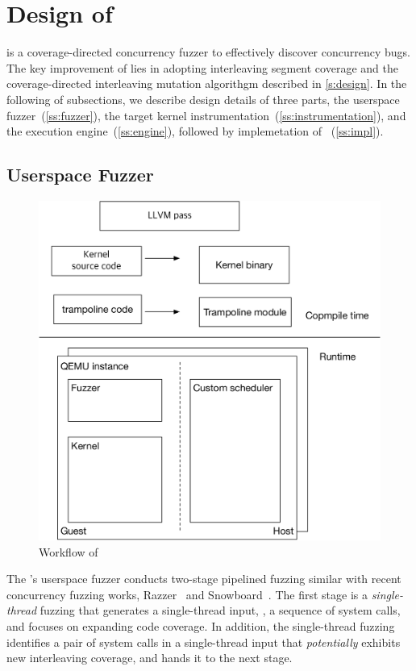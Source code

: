 \section{Design of \sys}
\label{s:impl}

\sys is a coverage-directed concurrency fuzzer to effectively discover
concurrency bugs.
%
The key improvement of \sys lies in adopting interleaving segment
coverage and the coverage-directed interleaving mutation algorithgm
described in \autoref{s:design}.
%
In the following of subsections, we describe design details of three
parts, the userspace fuzzer~(\autoref{ss:fuzzer}), the target kernel
instrumentation~(\autoref{ss:instrumentation}), and the execution
engine~(\autoref{ss:engine}), followed by implemetation of
\sys~(\autoref{ss:impl}).


\subsection{Userspace Fuzzer}
\label{ss:fuzzer}



\begin{figure}
  \includegraphics[width=0.9\linewidth]{fig/architecture.pdf}
  \caption{Workflow of \sys {}}
  \label{fig:workflow}
\end{figure}


The \sys's userspace fuzzer conducts two-stage pipelined fuzzing
similar with recent concurrency fuzzing works, Razzer~\cite{razzer}
and Snowboard~\cite{snowboard}.
%
The first stage is a \textit{single-thread} fuzzing that generates a
single-thread input, \ie, a sequence of system calls, and focuses on
expanding code coverage.
%
In addition, the single-thread fuzzing identifies a pair of system
calls in a single-thread input that \textit{potentially} exhibits new
interleaving coverage, and hands it to the next stage.


